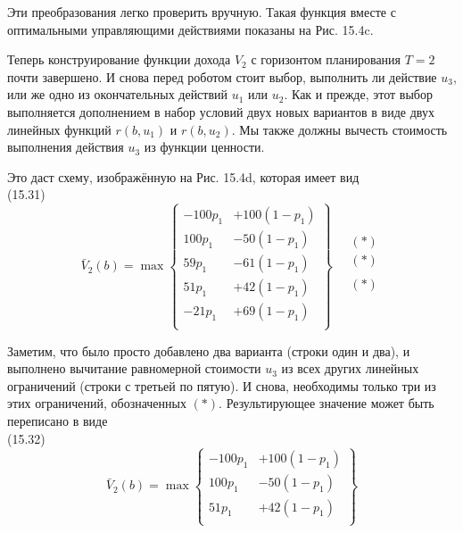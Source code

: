 \documentclass[10pt,a4paper]{article}
\begin{document}
Эти преобразования легко проверить вручную. Такая функция вместе с оптимальными управляющими действиями показаны на Рис. 15.4c.

Теперь конструирование функции дохода $V_2$ с горизонтом планирования $T = 2$ почти завершено. И снова перед роботом стоит выбор, выполнить ли действие $u_3$, или же одно из окончательных действий $u_1$ или $u_2$. Как и прежде, этот выбор выполняется дополнением в набор условий двух новых вариантов в виде двух линейных функций $r(b, u_1)$ и $r(b, u_2)$. Мы также должны вычесть стоимость выполнения действия $u_3$ из функции ценности.

Это даст схему, изображённую на Рис. 15.4d, которая имеет вид\\

(15.31)
\begin{equation*}
\bar{V}_2(b)=\max\left\{
\begin{array}{rr}
-100p_1&+100(1-p_1)\\
100p_1&-50(1-p_1)\\
59p_1&-61(1-p_1)\\
51p_1&+42(1-p_1)\\
-21p_1&+69(1-p_1)\\
\end{array}
\right\}\quad
\begin{array}{c}
(\ast)\\(\ast)\\{}\\(\ast)\\{}
\end{array}
\end{equation*}

Заметим, что было просто добавлено два варианта (строки один и два), и выполнено вычитание равномерной стоимости $u_3$ из всех других линейных ограничений (строки с третьей по пятую). И снова, необходимы только три из этих ограничений, обозначенных $(\ast)$. Результирующее значение может быть переписано в виде\\

(15.32)
\begin{equation*}
\bar{V}_2(b)=\max\left\{
\begin{array}{rr}
-100p_1&+100(1-p_1)\\
100p_1&-50(1-p_1)\\
51p_1&+42(1-p_1)\\
\end{array}
\right\}
\end{equation*}
\end{document}
